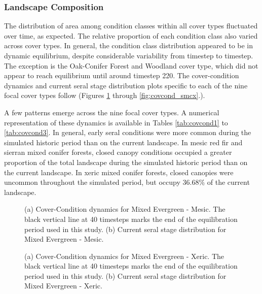 \subsubsection{Landscape Composition}

The distribution of area among condition classes within all cover types fluctuated over time, as expected. The relative proportion of each condition class also varied across cover types. In general, the condition class distribution appeared to be in dynamic equilibrium, despite considerable variability from timestep to timestep. The exception is the Oak-Conifer Forest and Woodland cover type, which did not appear to reach equilibrium until around timestep 220. The cover-condition dynamics and current seral stage distribution plots specific to each of the nine focal cover types follow (Figures \ref{fig:covcond_megm} through \ref{fig:covcond_smcx}.).

A few patterns emerge across the nine focal cover types. A numerical representation of these dynamics is available in Tables \ref{tab:covcond1} to \ref{tab:covcond3}. In general, early seral conditions were more common during the simulated historic period than on the current landscape. In mesic red fir and sierran mixed conifer forests, closed canopy conditions occupied a greater proportion of the total landscape during the simulated historic period than on the current landscape. In xeric mixed conifer forests, closed canopies were uncommon throughout the simulated period, but occupy 36.68\% of the current landscape.

\begin{figure}[!htbp]
  \centering
  \caption{(a) Cover-Condition dynamics for Mixed Evergreen - Mesic. The black vertical line at 40 timesteps marks the end of the equilibration period used in this study. (b) Current seral stage distribution for Mixed Evergreen - Mesic.}
\label{fig:covcond_megm}
\end{figure}


\begin{figure}[!htbp]
  \centering
  \caption{(a) Cover-Condition dynamics for Mixed Evergreen - Xeric. The black vertical line at 40 timesteps marks the end of the equilibration period used in this study. (b) Current seral stage distribution for Mixed Evergreen - Xeric.} 
  \label{fig:covcond_megx}
\end{figure}

